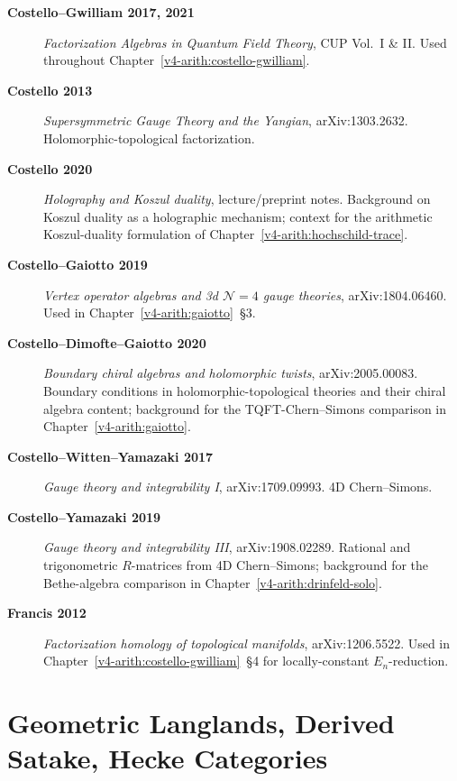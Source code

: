 \begin{description}
\item[\textbf{Costello--Gwilliam 2017, 2021}] \emph{Factorization
Algebras in Quantum Field Theory}, CUP Vol.~I \& II. Used
throughout Chapter~\ref{v4-arith:costello-gwilliam}.
\item[\textbf{Costello 2013}] \emph{Supersymmetric Gauge Theory and
the Yangian}, arXiv:1303.2632. Holomorphic-topological factorization.
\item[\textbf{Costello 2020}] \emph{Holography and Koszul duality},
lecture/preprint notes. Background on Koszul duality as a
holographic mechanism; context for the arithmetic Koszul-duality
formulation of Chapter~\ref{v4-arith:hochschild-trace}.
\item[\textbf{Costello--Gaiotto 2019}] \emph{Vertex operator
algebras and 3d \(\mathcal{N}=4\) gauge theories}, arXiv:1804.06460.
Used in Chapter~\ref{v4-arith:gaiotto}~\S3.
\item[\textbf{Costello--Dimofte--Gaiotto 2020}] \emph{Boundary
chiral algebras and holomorphic twists}, arXiv:2005.00083.
Boundary conditions in holomorphic-topological theories and their
chiral algebra content; background for the TQFT-Chern--Simons
comparison in Chapter~\ref{v4-arith:gaiotto}.
\item[\textbf{Costello--Witten--Yamazaki 2017}] \emph{Gauge theory
and integrability I}, arXiv:1709.09993. 4D Chern--Simons.
\item[\textbf{Costello--Yamazaki 2019}] \emph{Gauge theory and
integrability III}, arXiv:1908.02289. Rational and trigonometric
\(R\)-matrices from 4D Chern--Simons; background for the
Bethe-algebra comparison in Chapter~\ref{v4-arith:drinfeld-solo}.
\item[\textbf{Francis 2012}] \emph{Factorization homology of
topological manifolds}, arXiv:1206.5522. Used in
Chapter~\ref{v4-arith:costello-gwilliam}~\S4 for locally-constant
\(E_{n}\)-reduction.
\end{description}

\section{Geometric Langlands, Derived Satake, Hecke Categories}
\label{v4-arith:app:A:langlands}

